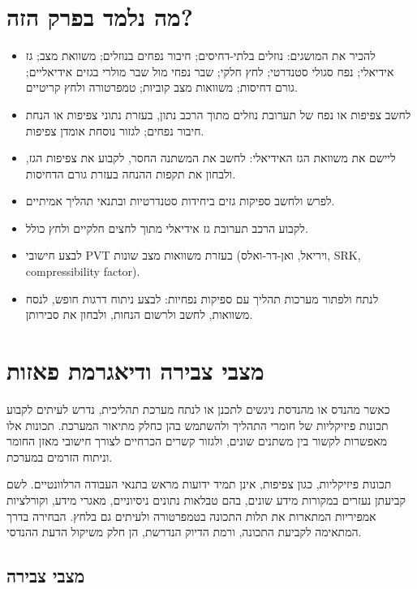 \documentclass[
  hebrew,
  letterpaper,
  DIV=11,
  numbers=noendperiod]{scrreprt}
\begin{document}
\section{מה נלמד בפרק
הזה?}\label{ux5deux5d4-ux5e0ux5dcux5deux5d3-ux5d1ux5e4ux5e8ux5e7-ux5d4ux5d6ux5d4-3}

\begin{itemize}
\item
  להכיר את המושגים: נוזלים בלתי-דחיסים; חיבור נפחים בנוזלים; משוואת מצב;
  גז אידיאלי; נפח סגולי סטנדרטי; לחץ חלקי; שבר נפחי מול שבר מולרי בגזים
  אידיאליים; גורם דחיסות; משוואות מצב קוביות; טמפרטורה ולחץ קריטיים.
\item
  לחשב צפיפות או נפח של תערובת נוזלים מתוך הרכב נתון, בעזרת נתוני צפיפות
  או הנחת חיבור נפחים; לגזור נוסחת אומדן צפיפות.
\item
  ליישם את משוואת הגז האידיאלי: לחשב את המשתנה החסר, לקבוע את צפיפות
  הגז, ולבחון את תקפות ההנחה בעזרת גורם הדחיסות.
\item
  לפרש ולחשב ספיקות גזים ביחידות סטנדרטיות ובתנאי תהליך אמיתיים.
\item
  לקבוע הרכב תערובת גז אידיאלי מתוך לחצים חלקיים ולחץ כולל.
\item
  לבצע חישובי PVT בעזרת משוואות מצב שונות (ויריאל, ואן-דר-ואלס, SRK,
  compressibility factor).
\item
  לנתח ולפתור מערכות תהליך עם ספיקות נפחיות: לבצע ניתוח דרגות חופש, לנסח
  משוואות, לחשב ולרשום הנחות, ולבחון את סבירותן.
\end{itemize}

\section{מצבי צבירה ודיאגרמת
פאזות}\label{ux5deux5e6ux5d1ux5d9-ux5e6ux5d1ux5d9ux5e8ux5d4-ux5d5ux5d3ux5d9ux5d0ux5d2ux5e8ux5deux5ea-ux5e4ux5d0ux5d6ux5d5ux5ea}

כאשר מהנדס או מהנדסת ניגשים לתכנן או לנתח מערכת תהליכית, נדרש לעיתים
לקבוע תכונות פיזיקליות של חומרי התהליך ולהשתמש בהן כחלק מתיאור המערכת.
תכונות אלו מאפשרות לקשור בין משתנים שונים, ולגזור קשרים הכרחיים לצורך
חישובי מאזן החומר וניתוח הזרמים במערכת.

תכונות פיזיקליות, כגון צפיפות, אינן תמיד ידועות מראש בתנאי העבודה
הרלוונטיים. לשם קביעתן נעזרים במקורות מידע שונים, בהם טבלאות נתונים
ניסיוניים, מאגרי מידע, וקורלציות אמפיריות המתארות את תלות התכונה
בטמפרטורה ולעיתים גם בלחץ. הבחירה בדרך המתאימה לקביעת התכונה, ורמת הדיוק
הנדרשת, הן חלק משיקול הדעת ההנדסי.

\subsection{מצבי
צבירה}\label{ux5deux5e6ux5d1ux5d9-ux5e6ux5d1ux5d9ux5e8ux5d4}
\end{document}
